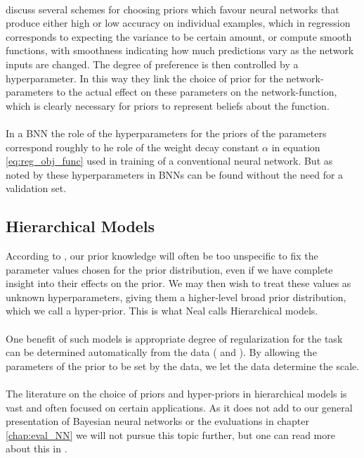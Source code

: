 \\
\cite{buntine_weigend1991} discuss several schemes for choosing priors which favour neural networks that produce either high or low accuracy on individual examples, which in regression corresponds to expecting the variance to be certain amount, or compute smooth functions, with smoothness indicating how much predictions vary as the network inputs are changed. The degree of preference is then controlled by a hyperparameter. In this way they link the choice of prior for the network-parameters to the actual effect on these parameters on the network-function, which is clearly necessary for priors to represent beliefs about the function. 
\\
\\
In a BNN the role of the hyperparameters for the priors of the parameters correspond roughly to he role of the weight decay constant $\alpha$ in equation \ref{eq:reg_obj_func} used in training of a conventional neural network. But as noted by \cite{neal2012bayesian} these hyperparameters in BNNs can be found without the need for a validation set.


\subsection{Hierarchical Models} \label{sec:hier_models}
According to \cite{neal2012bayesian}, our prior knowledge will often be too unspecific to fix the parameter values chosen for the prior distribution, even if we have complete insight into their effects on the prior. We may then wish to treat these values as unknown hyperparameters, giving them a higher-level broad prior distribution, which we call a hyper-prior. This is what Neal calls Hierarchical models. \\
\\
One benefit of such models is appropriate degree of regularization for the task can be determined automatically from the data (\cite{mackay1991} and \cite{MacKay1992}). By allowing the parameters of the prior to be set by the data, we let the data determine the scale.\\
\\
The literature on the choice of priors and hyper-priors in hierarchical models is vast and often focused on certain applications. As it does not add to our general presentation of Bayesian neural networks or the evaluations in chapter \ref{chap:eval_NN} we will not pursue this topic further, but one can read more about this in \cite{gelmanbda04}.





